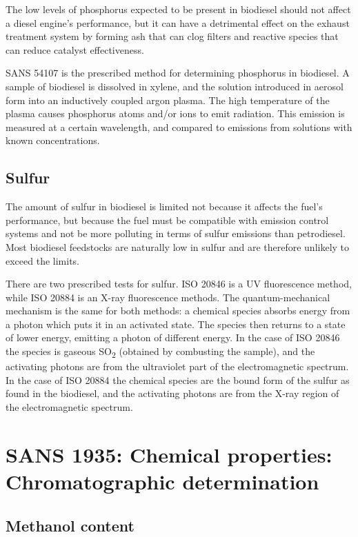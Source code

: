 The low levels of phosphorus expected to be present in biodiesel should not
affect a diesel engine's performance, but it can have a detrimental effect on
the exhaust treatment system by forming ash that can clog filters and reactive
species that can reduce catalyst effectiveness.
 
SANS 54107 is the prescribed method for determining phosphorus in biodiesel. A
sample of biodiesel is dissolved in xylene, and the solution introduced in
aerosol form into an inductively coupled argon plasma. The high temperature of
the plasma causes phosphorus atoms and/or ions to emit radiation. This emission
is measured at a certain wavelength, and compared to emissions from solutions
with known concentrations.

\subsection{Sulfur}

The amount of sulfur in biodiesel is limited not because it affects the fuel's
performance, but because the fuel must be compatible with emission control
systems and not be more polluting in terms of sulfur emissions than petrodiesel.
Most biodiesel feedstocks are naturally low in sulfur and are therefore unlikely
to exceed the limits.

There are two prescribed tests for sulfur. ISO 20846 is a UV fluorescence
method, while ISO 20884 is an X-ray fluorescence methods. The quantum-mechanical
mechanism is the same for both methods: a chemical species absorbs energy from a
photon which puts it in an activated state. The species then returns to a state
of lower energy, emitting a photon of different energy.
In the case of ISO 20846 the species is gaseous SO\textsubscript{2} (obtained by
combusting the sample), and the activating photons are from the ultraviolet part
of the electromagnetic spectrum. In the case of ISO 20884 the chemical species
are the bound form of the sulfur as found in the biodiesel, and the activating
photons are from the X-ray region of the electromagnetic spectrum.

\section{SANS 1935: Chemical properties: Chromatographic determination}
\label{sec:ChromDet}

\subsection{Methanol content}

